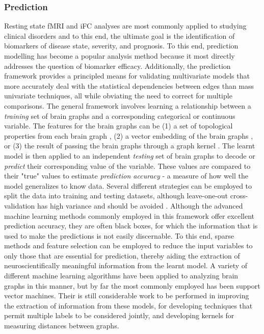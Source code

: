 \subsubsection{Prediction}

Resting state fMRI and iFC analyses are most commonly applied to studying
clinical disorders and to this end, the ultimate goal is the identification of
biomarkers of disease state, severity, and prognosis\cite{DiMartino}. To this
end, prediction modelling has become a popular analysis method because it most
directly addresses the question of biomarker
efficacy\cite{craddock,Dosenbach,review}. Additionally, the prediction
framework provides a principled means for validating multivariate models that
more accurately deal with the statistical dependencies between edges than mass
univariate techniques, all while obviating the need to correct for multiple
comparisons. The general framework involves learning a relationship between a
\emph{training} set of brain graphs and a corresponding categorical or
continuous variable. The features for the brain graphs can be (1) a set of
topological properties from each brain graph \cite{Cecci2009, Bassett2012}, (2)
a vector embedding of the brain graphs \cite{Richiadi2013,Luo2003}, or (3) the
result of passing the brain graphs through a graph kernel \cite{}. The learnt
model is then applied to an independent \emph{testing} set of brain graphs to
decode or \emph{predict} their corresponding value of the variable. These
values are compared to their "true" values to estimate \emph{prediction
accuracy} - a measure of how well the model generalizes to know data. Several
different strategies can be employed to split the data into training and
testing datasets, although leave-one-out cross-validation has high variance and
should be avoided \cite{}. Although the advanced machine learning methods
commonly employed in this framework offer excellent prediction accuracy, they
are often black boxes, for which the information that is used to make the
predictions is not easily discernable. To this end, sparse methods and feature
selection can be employed to reduce the input variables to only those that are
essential for prediction, thereby aiding the extraction of neuroscientifically
meaningful information from the learnt model. A variety of different machine
learning algorithms have been applied to analyzing brain graphs in this manner,
but by far the most commonly employed has been support vector
machines\cite{DiMartino}. Their is still considerable work to be performed in
improving the extraction of information from these models, for developing
techniques that permit multiple labels to be considered jointly, and developing
kernels for measuring distances between graphs.


